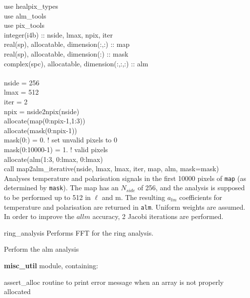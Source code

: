 \begin{example}
{
use healpix\_types\\
use alm\_tools\\
use pix\_tools\\
integer(i4b) :: nside, lmax, npix, iter \\
real(sp), allocatable, dimension(:,:) :: map \\
real(sp), allocatable, dimension(:) :: mask \\
complex(spc), allocatable, dimension(:,:,:) :: alm \\
\\
nside = 256 \\
lmax = 512 \\
iter = 2\\
npix = nside2npix(nside) \\
allocate(map(0:npix-1,1:3)) \\
allocate(mask(0:npix-1)) \\
mask(0:) = 0. ! set unvalid pixels to 0\\
mask(0:10000-1) = 1. ! valid pixels \\
allocate(alm(1:3, 0:lmax, 0:lmax)\\
call map2alm\_iterative(nside, lmax, lmax, iter, map, alm, mask=mask)  \\
}
{
Analyses temperature and polarisation signals in the first 10000 pixels of {\tt map} (as
determined by {\tt mask}). The map has
an $N_{side}$ of 256, and the analysis is supposed to be performed up
to 512 in $\ell$ and m. The resulting $a_{lm}$ coefficients for
temperature and polarisation are returned in {\tt alm}. Uniform weights are
assumed. In order to improve the $al{lm}$ accuracy, 2 Jacobi iterations are performed.
}
\end{example}

\begin{modules}
  \begin{sulist}{} %
  \item[ring\_analysis] Performs FFT for the ring analysis.
  \item[\htmlref{map2alm}{sub:map2alm}] Perform the alm analysis
  \item[\textbf{misc\_util}] module, containing:
  \item[assert\_alloc] routine to print error message when an array is not
  properly allocated		
  \end{sulist}
\end{modules}


